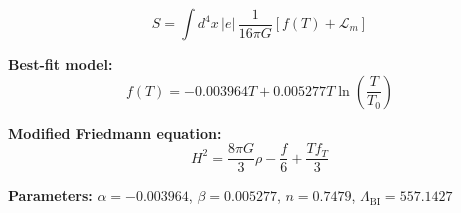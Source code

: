 
\begin{equation}
  S = \int d^4x \, |e| \, \frac{1}{16\pi G} \left[ f(T) + \mathcal{L}_m \right]
\end{equation}

\textbf{Best-fit model:}
\begin{equation}
  f(T) = -0.003964 T + 0.005277 T \ln\!\left(\frac{T}{T_0}\right)
\end{equation}

\textbf{Modified Friedmann equation:}
\begin{equation}
  H^2 = \frac{8\pi G}{3} \rho - \frac{f}{6} + \frac{T f_T}{3}
\end{equation}

\textbf{Parameters:}
$\alpha = -0.003964$, \quad
$\beta = 0.005277$, \quad
$n = 0.7479$, \quad
$\Lambda_{\text{BI}} = 557.1427$